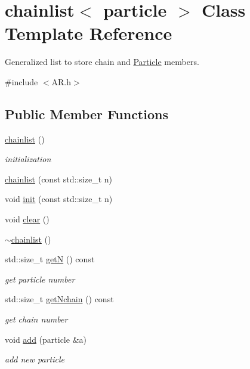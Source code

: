 \hypertarget{classchainlist}{}\section{chainlist$<$ particle $>$ Class Template Reference}
\label{classchainlist}


Generalized list to store chain and \hyperlink{classParticle}{Particle} members.  




{\ttfamily \#include $<$A\+R.\+h$>$}

\subsection*{Public Member Functions}
\begin{DoxyCompactItemize}
\item 
\hyperlink{classchainlist_a13b0a9849f6b7739838ff2650f87ab77}{chainlist} ()
\begin{DoxyCompactList}\small\item\em initialization \end{DoxyCompactList}\item 
\hyperlink{classchainlist_a83cda067438cef02618f7cb042d8273b}{chainlist} (const std\+::size\+\_\+t n)
\item 
void \hyperlink{classchainlist_a5890d32b99e977a9b64e10a1df140353}{init} (const std\+::size\+\_\+t n)
\item 
void \hyperlink{classchainlist_ab3e3716be84c058ad25637602f1712e0}{clear} ()
\item 
\hyperlink{classchainlist_a94280239766a3dcc0648813fbe14dcc1}{$\sim$chainlist} ()
\item 
std\+::size\+\_\+t \hyperlink{classchainlist_a828ce844e9b009c9da96a6ea613ebf73}{getN} () const
\begin{DoxyCompactList}\small\item\em get particle number \end{DoxyCompactList}\item 
std\+::size\+\_\+t \hyperlink{classchainlist_aeba7adee0d0820d63fd0bb933f4abd57}{get\+Nchain} () const
\begin{DoxyCompactList}\small\item\em get chain number \end{DoxyCompactList}\item 
void \hyperlink{classchainlist_a0d56fff164cdb326e41e5f4bfd69cfa7}{add} (particle \&a)
\begin{DoxyCompactList}\small\item\em add new particle \end{DoxyCompactList}\item 

\end{DoxyCompactItemize}

